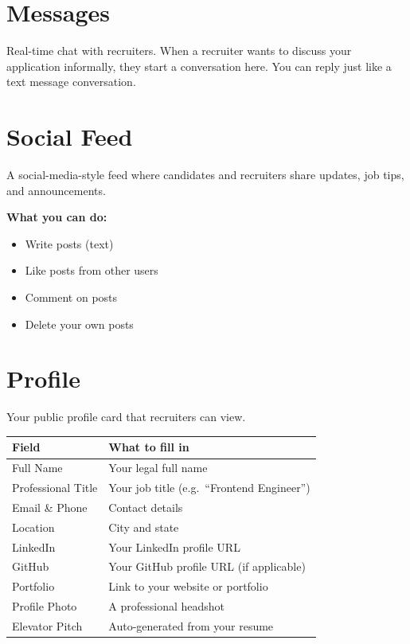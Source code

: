 \documentclass[12pt, a4paper]{report}
\begin{document}
\section{Messages}

Real-time chat with recruiters.  When a recruiter wants to discuss your application
informally, they start a conversation here.  You can reply just like a text
message conversation.

\section{Social Feed}

A social-media-style feed where candidates and recruiters share updates, job tips,
and announcements.

\textbf{What you can do:}
\begin{itemize}
  \item Write posts (text)
  \item Like posts from other users
  \item Comment on posts
  \item Delete your own posts
\end{itemize}

\section{Profile}

Your public profile card that recruiters can view.

\begin{center}
\begin{tabularx}{\textwidth}{lX}
\toprule
\textbf{Field} & \textbf{What to fill in} \\
\midrule
Full Name          & Your legal full name \\
Professional Title & Your job title (e.g.\ ``Frontend Engineer'') \\
Email \& Phone     & Contact details \\
Location           & City and state \\
LinkedIn           & Your LinkedIn profile URL \\
GitHub             & Your GitHub profile URL (if applicable) \\
Portfolio          & Link to your website or portfolio \\
Profile Photo      & A professional headshot \\
Elevator Pitch     & Auto-generated from your resume \\
\bottomrule
\end{tabularx}
\end{center}
\end{document}
